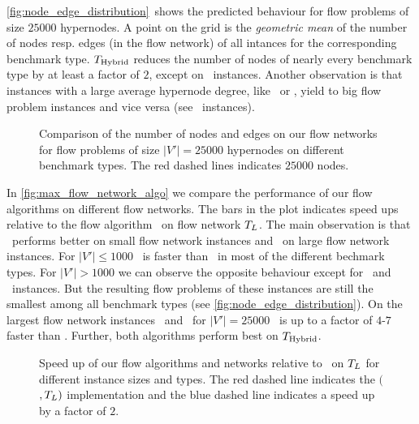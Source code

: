 \autoref{fig:node_edge_distribution}~shows the predicted behaviour for flow problems of size
$25000$ hypernodes. A point on the grid is the \emph{geometric mean} of the number of 
nodes resp. edges (in the flow network) of all intances for the corresponding benchmark type.
$T_{\text{Hybrid}}$ reduces the number of nodes of nearly every benchmark type by at least a factor
of $2$, except on \SPM~instances. Another observation is that instances with a large average 
hypernode degree, like \Primal~or \Literal, yield to big flow problem instances and vice 
versa (see \Dual~instances).\\
\begin{figure}
\centering
\caption{Comparison of the number of nodes and edges on our flow networks for 
         flow problems of size $|V'| = 25000$ hypernodes on different benchmark types.
         The red dashed lines indicates $25000$ nodes.}
\label{fig:node_edge_distribution}
\end{figure} 
In \autoref{fig:max_flow_network_algo} we compare the performance of our flow algorithms on
different flow networks. The bars in the plot indicates speed ups relative to the flow algorithm
\EdmondKarp~on flow network $T_L$. The main observation is that \EdmondKarp~performs
better on small flow network instances and \GoldbergTarjan~on large flow network instances. For $|V'| \le 1000$
\EdmondKarp~is faster than \GoldbergTarjan~in most of the different bechmark types. For
$|V'| > 1000$ we can observe the opposite behaviour except for \DAC~and \Dual~instances. But the
resulting flow problems of these instances are still the smallest among all benchmark types
(see \autoref{fig:node_edge_distribution}). On the largest flow network instances \Primal~and
\Literal~for $|V'| = 25000$ \GoldbergTarjan~is up to a factor of $4$-$7$ faster than \EdmondKarp.
Further, both algorithms perform best on $T_{\text{Hybrid}}$.

\begin{figure}
\centering
\caption{Speed up of our flow algorithms and networks relative to \EdmondKarp~on
         $T_L$ for different instance sizes and types. The red dashed line indicates the
         $($\EdmondKarp$,T_L)$ implementation and the blue dashed line
         indicates a speed up by a factor of $2$.}
\label{fig:max_flow_network_algo}
\end{figure} 


